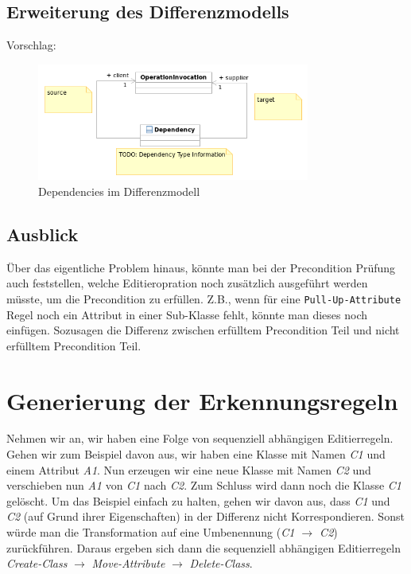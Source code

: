 \subsection{Erweiterung des Differenzmodells}

Vorschlag:
\begin{figure}[htb]
  \centering
  \includegraphics[width=0.8\textwidth]{img/Dependencies.png}
  \caption{Dependencies im Differenzmodell}
  \label{fig:Dependencies}
\end{figure}

\subsection{Ausblick}

Über das eigentliche Problem hinaus, könnte man bei der Precondition Prüfung auch feststellen,
welche Editieropration noch zusätzlich ausgeführt werden müsste, um die Precondition zu erfüllen.
Z.B., wenn für eine \texttt{Pull-Up-Attribute} Regel noch ein Attribut in einer Sub-Klasse fehlt,
könnte man dieses noch einfügen. Sozusagen die Differenz zwischen erfülltem Precondition Teil und
nicht erfülltem Precondition Teil.



\section{Generierung der Erkennungsregeln}

Nehmen wir an, wir haben eine Folge von sequenziell abhängigen Editierregeln. Gehen wir zum Beispiel
davon aus, wir haben eine Klasse mit Namen \textit{C1} und einem Attribut \textit{A1}.
Nun erzeugen wir eine neue Klasse mit Namen \textit{C2} und verschieben nun \textit{A1} von
\textit{C1} nach \textit{C2}. Zum Schluss wird dann noch die Klasse \textit{C1} gelöscht. Um das
Beispiel einfach zu halten, gehen wir davon aus, dass \textit{C1} und \textit{C2} (auf Grund ihrer
Eigenschaften) in der Differenz nicht Korrespondieren. Sonst würde man die Transformation auf eine
Umbenennung (\textit{C1 $\to$ C2}) zurückführen. Daraus ergeben sich dann die sequenziell abhängigen
Editierregeln \textit{Create-Class} $\to$ \textit{Move-Attribute} $\to$ \textit{Delete-Class}.

